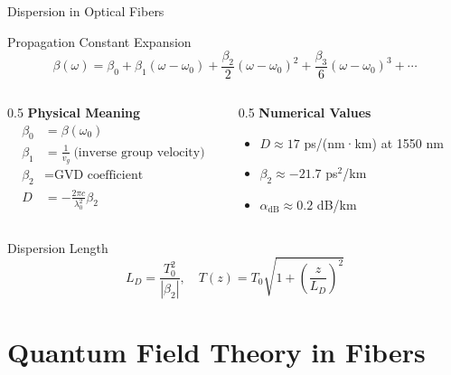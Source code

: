 \documentclass[10pt]{beamer}
\begin{document}
\begin{frame}{Dispersion in Optical Fibers}
\begin{block}{Propagation Constant Expansion}
\begin{equation*}
\beta(\omega) = \beta_0 + \beta_1(\omega - \omega_0) + \frac{\beta_2}{2}(\omega - \omega_0)^2 + \frac{\beta_3}{6}(\omega - \omega_0)^3 + \cdots
\end{equation*}
\end{block}

\begin{columns}
\begin{column}{0.5\textwidth}
\textbf{Physical Meaning}
\begin{align*}
\beta_0 &= \beta(\omega_0) \\
\beta_1 &= \frac{1}{v_g} \ \text{(inverse group velocity)} \\
\beta_2 &= \text{GVD coefficient} \\
D &= -\frac{2\pi c}{\lambda_0^2}\beta_2
\end{align*}
\end{column}

\begin{column}{0.5\textwidth}
\textbf{Numerical Values}
\begin{itemize}
\item $D \approx 17$ ps/(nm·km) at 1550 nm
\item $\beta_2 \approx -21.7$ ps$^2$/km
\item $\alpha_{\text{dB}} \approx 0.2$ dB/km
\end{itemize}
\end{column}
\end{columns}

\begin{block}{Dispersion Length}
\begin{equation*}
L_D = \frac{T_0^2}{|\beta_2|}, \quad T(z) = T_0\sqrt{1 + \left(\frac{z}{L_D}\right)^2}
\end{equation*}
\end{block}
\end{frame}

\section{Quantum Field Theory in Fibers}
\end{document}
